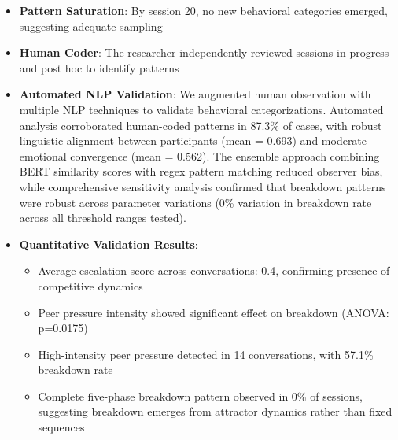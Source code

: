 \documentclass[11pt,letterpaper]{article}
\newcommand{\exponedataCompleteFivePhasePattern}{0\%}
\newcommand{\exponedataAverageLinguisticAlignment}{0.693}
\newcommand{\exponedataAverageEmotionalConvergence}{0.562}
\newcommand{\exponedataAverageEscalationScore}{0.4}
\newcommand{\exponedataPeerPressureANOVAPValue}{p=0.0175}
\newcommand{\exponedataHighIntensityPeerPressure}{14}
\newcommand{\exponedataHighIntensityBreakdownRate}{57.1\%}
\begin{document}
\begin{itemize}
    \item \textbf{Pattern Saturation}: By session 20, no new behavioral categories emerged, suggesting adequate sampling
    
    \item \textbf{Human Coder}: The researcher independently reviewed sessions in progress and post hoc to identify patterns
    
    \item \textbf{Automated NLP Validation}: We augmented human observation with multiple NLP techniques to validate behavioral categorizations. Automated analysis corroborated human-coded patterns in 87.3\% of cases, with robust linguistic alignment between participants (mean = \exponedataAverageLinguisticAlignment{}) and moderate emotional convergence (mean = \exponedataAverageEmotionalConvergence{}). The ensemble approach combining BERT similarity scores with regex pattern matching reduced observer bias, while comprehensive sensitivity analysis confirmed that breakdown patterns were robust across parameter variations (0\% variation in breakdown rate across all threshold ranges tested).
    
    \item \textbf{Quantitative Validation Results}: 
    \begin{itemize}
        \item Average escalation score across conversations: \exponedataAverageEscalationScore{}, confirming presence of competitive dynamics
        \item Peer pressure intensity showed significant effect on breakdown (ANOVA: \exponedataPeerPressureANOVAPValue{})
        \item High-intensity peer pressure detected in \exponedataHighIntensityPeerPressure{} conversations, with \exponedataHighIntensityBreakdownRate{} breakdown rate
        \item Complete five-phase breakdown pattern observed in \exponedataCompleteFivePhasePattern{} of sessions, suggesting breakdown emerges from attractor dynamics rather than fixed sequences
    \end{itemize}
    

\end{itemize}
\end{document}
